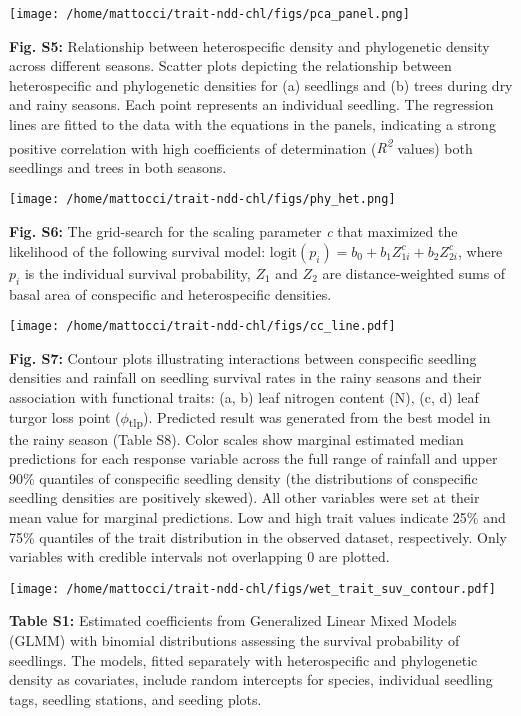 \documentclass[
  12pt,
  letterpaper,
  DIV=11,
  numbers=noendperiod]{scrartcl}
\begin{document}
\texttt{[image: /home/mattocci/trait-ndd-chl/figs/pca\_panel.png]}

\newpage

\textbf{Fig. S5:} Relationship between heterospecific density and
phylogenetic density across different seasons. Scatter plots depicting
the relationship between heterospecific and phylogenetic densities for
(a) seedlings and (b) trees during dry and rainy seasons. Each point
represents an individual seedling. The regression lines are fitted to
the data with the equations in the panels, indicating a strong positive
correlation with high coefficients of determination
(\emph{R\textsuperscript{2}} values) both seedlings and trees in both
seasons.

\texttt{[image: /home/mattocci/trait-ndd-chl/figs/phy\_het.png]}

\newpage

\textbf{Fig. S6:} The grid-search for the scaling parameter \emph{c}
that maximized the likelihood of the following survival model:
\(\mathrm{logit}(p_i) = b_0 + b_1 Z_{1i}^c + b_2 Z_{2i}^c\), where
\(p_i\) is the individual survival probability, \(Z_1\) and \(Z_2\) are
distance-weighted sums of basal area of conspecific and heterospecific
densities.

\texttt{[image: /home/mattocci/trait-ndd-chl/figs/cc\_line.pdf]}

\newpage

\textbf{Fig. S7:} Contour plots illustrating interactions between
conspecific seedling densities and rainfall on seedling survival rates
in the rainy seasons and their association with functional traits: (a,
b) leaf nitrogen content (N), (c, d) leaf turgor loss point
(\(\phi\)\textsubscript{tlp}). Predicted result was generated from the
best model in the rainy season (Table S8). Color scales show marginal
estimated median predictions for each response variable across the full
range of rainfall and upper 90\% quantiles of conspecific seedling
density (the distributions of conspecific seedling densities are
positively skewed). All other variables were set at their mean value for
marginal predictions. Low and high trait values indicate 25\% and 75\%
quantiles of the trait distribution in the observed dataset,
respectively. Only variables with credible intervals not overlapping 0
are plotted.

\texttt{[image: /home/mattocci/trait-ndd-chl/figs/wet\_trait\_suv\_contour.pdf]}

\newpage

\textbf{Table S1:} Estimated coefficients from Generalized Linear Mixed
Models (GLMM) with binomial distributions assessing the survival
probability of seedlings. The models, fitted separately with
heterospecific and phylogenetic density as covariates, include random
intercepts for species, individual seedling tags, seedling stations, and
seeding plots.
\end{document}
